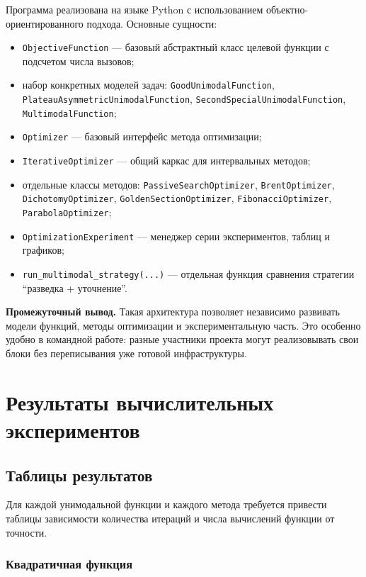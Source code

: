 \documentclass[14pt,a4paper]{extarticle}
\begin{document}
Программа реализована на языке Python с использованием объектно-ориентированного подхода. Основные сущности:
\begin{itemize}
    \item \texttt{ObjectiveFunction} --- базовый абстрактный класс целевой функции с подсчетом числа вызовов;
    \item набор конкретных моделей задач: \texttt{GoodUnimodalFunction}, \texttt{PlateauAsymmetricUnimodalFunction}, \texttt{SecondSpecialUnimodalFunction}, \texttt{MultimodalFunction};
    \item \texttt{Optimizer} --- базовый интерфейс метода оптимизации;
    \item \texttt{IterativeOptimizer} --- общий каркас для интервальных методов;
    \item отдельные классы методов: \texttt{PassiveSearchOptimizer}, \texttt{BrentOptimizer}, \texttt{DichotomyOptimizer}, \texttt{GoldenSectionOptimizer}, \texttt{FibonacciOptimizer}, \texttt{ParabolaOptimizer};
    \item \texttt{OptimizationExperiment} --- менеджер серии экспериментов, таблиц и графиков;
    \item \texttt{run\_multimodal\_strategy(...)} --- отдельная функция сравнения стратегии ``разведка + уточнение''.
\end{itemize}

\textbf{Промежуточный вывод.} Такая архитектура позволяет независимо развивать модели функций, методы оптимизации и экспериментальную часть. Это особенно удобно в командной работе: разные участники проекта могут реализовывать свои блоки без переписывания уже готовой инфраструктуры.

\section{Результаты вычислительных экспериментов}

\subsection{Таблицы результатов}

Для каждой унимодальной функции и каждого метода требуется привести таблицы зависимости количества итераций и числа вычислений функции от точности.

\subsubsection{Квадратичная функция}
\small

\normalsize
\end{document}

